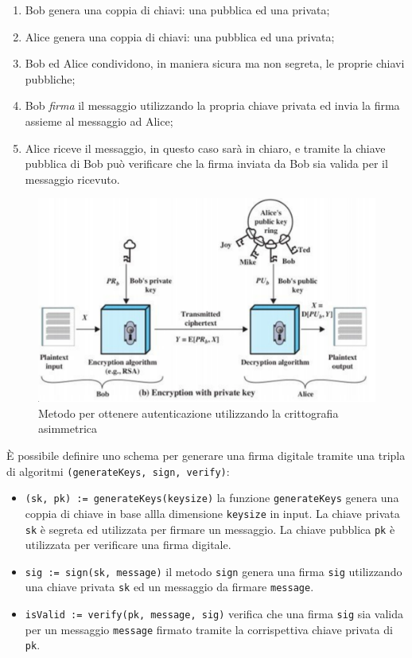\begin{enumerate}
    \item Bob genera una coppia di chiavi: una pubblica ed una privata;
    \item Alice genera una coppia di chiavi: una pubblica ed una privata;
    \item Bob ed Alice condividono, in maniera sicura ma non segreta, le proprie chiavi pubbliche;
    \item Bob \textit{firma} il messaggio utilizzando la propria chiave privata ed invia la firma assieme al messaggio ad Alice;
    \item Alice riceve il messaggio, in questo caso sarà in chiaro, e tramite la chiave pubblica di Bob può verificare che la firma inviata da Bob sia valida per il messaggio ricevuto.
\end{enumerate}
\begin{figure}
    \centering
    \includegraphics[scale=0.3]{images/authentication.png}
    \caption{Metodo per ottenere autenticazione utilizzando la crittografia asimmetrica}
\end{figure}
È possibile definire uno schema per generare una firma digitale tramite una tripla di algoritmi \texttt{(generateKeys, sign, verify)}:

\begin{itemize}
    \item \texttt{(sk, pk) := generateKeys(keysize)} la funzione \texttt{generateKeys} genera una coppia di chiave in base allla dimensione \texttt{keysize} in input. La chiave privata \texttt{sk} è segreta ed utilizzata per firmare un messaggio. La chiave pubblica \texttt{pk} è utilizzata per verificare una firma digitale.
    \item \texttt{sig := sign(sk, message)} il metodo \texttt{sign} genera una firma \texttt{sig} utilizzando una chiave privata \texttt{sk} ed un messaggio da firmare \texttt{message}.
    \item \texttt{isValid := verify(pk, message, sig)} verifica che una firma \texttt{sig} sia valida per un messaggio \texttt{message} firmato tramite la corrispettiva chiave privata di \texttt{pk}.
\end{itemize}

